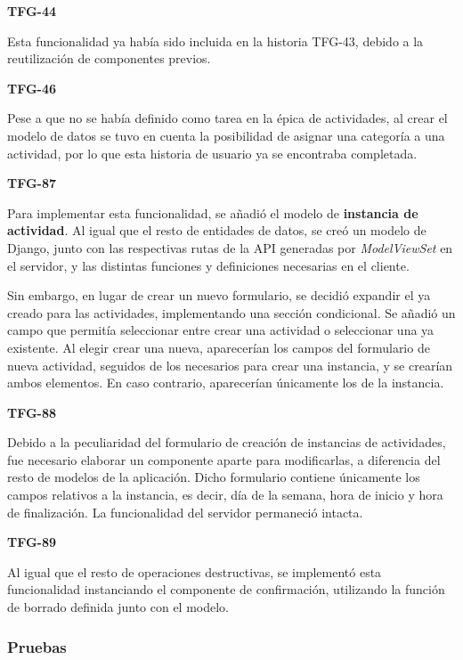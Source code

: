 \documentclass[10pt, a4paper]{aqademic}
\begin{document}
\medskip

\textbf{TFG-44}

Esta funcionalidad ya había sido incluida en la historia TFG-43, debido a la reutilización de componentes previos.

\medskip

\textbf{TFG-46}

Pese a que no se había definido como tarea en la épica de actividades, al crear el modelo de datos se tuvo en cuenta la posibilidad de asignar una categoría a una actividad, por lo que esta historia de usuario ya se encontraba completada.

\medskip

\textbf{TFG-87}

Para implementar esta funcionalidad, se añadió el modelo de \textbf{instancia de actividad}. Al igual que el resto de entidades de datos, se creó un modelo de Django, junto con las respectivas rutas de la API generadas por \textit{ModelViewSet} en el servidor, y las distintas funciones y definiciones necesarias en el cliente.

Sin embargo, en lugar de crear un nuevo formulario, se decidió expandir el ya creado para las actividades, implementando una sección condicional. Se añadió un campo que permitía seleccionar entre crear una actividad o seleccionar una ya existente. Al elegir crear una nueva, aparecerían los campos del formulario de nueva actividad, seguidos de los necesarios para crear una instancia, y se crearían ambos elementos. En caso contrario, aparecerían únicamente los de la instancia.

\medskip

\textbf{TFG-88}

Debido a la peculiaridad del formulario de creación de instancias de actividades, fue necesario elaborar un componente aparte para modificarlas, a diferencia del resto de modelos de la aplicación. Dicho formulario contiene únicamente los campos relativos a la instancia, es decir, día de la semana, hora de inicio y hora de finalización. La funcionalidad del servidor permaneció intacta.

\medskip

\textbf{TFG-89}

Al igual que el resto de operaciones destructivas, se implementó esta funcionalidad instanciando el componente de confirmación, utilizando la función de borrado definida junto con el modelo.


\subsubsection{Pruebas}
\end{document}

